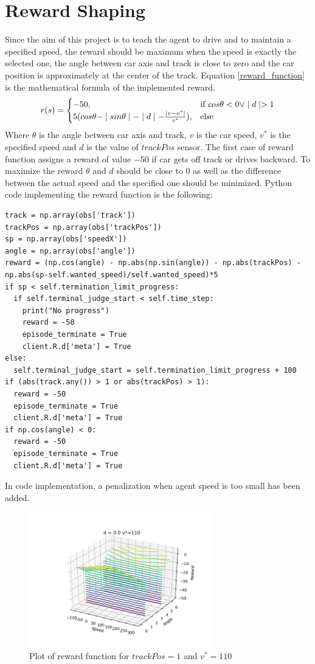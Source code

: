 \documentclass[Lau,oneside,noexaminfo]{sapthesis} %
\begin{document}
\section{Reward Shaping}
Since the aim of this project is to teach the agent to drive and to maintain a specified speed, the reward should be maximum when the speed is exactly the selected one, the angle between car axis and track is close to zero and the car position is approximately at the center of the track.
Equation \ref{reward_function} is the mathematical formula of the implemented reward.
\begin{equation}
r(s) = \begin{cases} -50, & \mbox{if } cos \theta < 0  \vee \mid d \mid > 1 \\ 5(cos\theta - \mid sin\theta \mid - \mid d \mid - {\mid v - v^*\mid \over v^*}), & \mbox{else} \end{cases}
\label{reward_function}
\end{equation}
Where $\theta$ is the angle between car axis and track, $v$ is the car speed, $v^*$ is the specified speed and $d$ is the value of $trackPos$ sensor. The first case of reward function assigns a reward of value $-50$ if car gets off track or drives backward.
To maximize the reward $\theta$ and $d$ should be close to $0$ as well as the difference between the actual speed and the specified one should be minimized.
Python code implementing the reward function is the following:
\begin{lstlisting}
track = np.array(obs['track'])
trackPos = np.array(obs['trackPos'])
sp = np.array(obs['speedX'])
angle = np.array(obs['angle'])
reward = (np.cos(angle) - np.abs(np.sin(angle)) - np.abs(trackPos) - np.abs(sp-self.wanted_speed)/self.wanted_speed)*5
if sp < self.termination_limit_progress:
  if self.terminal_judge_start < self.time_step:
    print("No progress")
    reward = -50
    episode_terminate = True
    client.R.d['meta'] = True
else:
  self.terminal_judge_start = self.termination_limit_progress + 100
if (abs(track.any()) > 1 or abs(trackPos) > 1):
  reward = -50
  episode_terminate = True
  client.R.d['meta'] = True
if np.cos(angle) < 0:
  reward = -50
  episode_terminate = True
  client.R.d['meta'] = True
\end{lstlisting}
In code implementation, a penalization when agent speed is too small has been added.
\begin{figure}[H]
  \centering
  \includegraphics[width=0.7\textwidth]{reward_plot0}
  \caption{Plot of reward function for $trackPos = 1$ and $v^*=110$}
  \label{rewardshapingplot0}
\end{figure}
\end{document}
